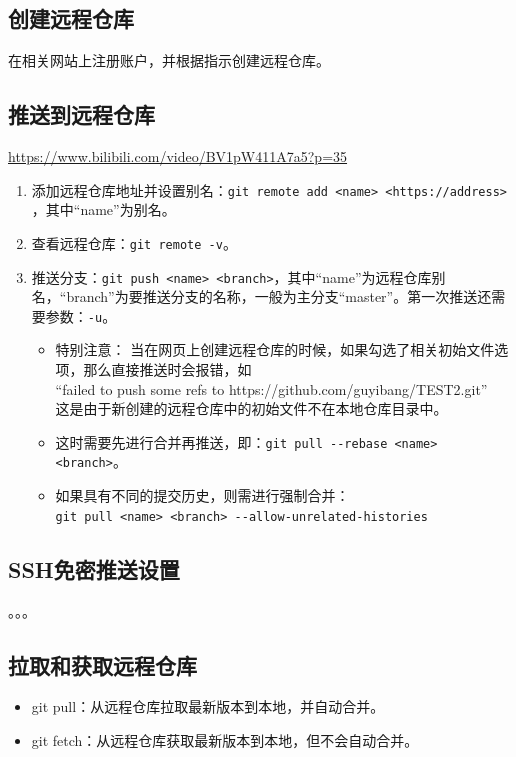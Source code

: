 \subsection{创建远程仓库}
在相关网站上注册账户，并根据指示创建远程仓库。



\subsection{推送到远程仓库}
\url{https://www.bilibili.com/video/BV1pW411A7a5?p=35}
\begin{enumerate}
\item 添加远程仓库地址并设置别名：\verb|git remote add <name> <https://address> |，其中“name”为别名。
\item 查看远程仓库：\verb|git remote -v|。
\item 推送分支：\verb|git push <name> <branch>|，其中“name”为远程仓库别名，“branch”为要推送分支的名称，一般为主分支“master”。第一次推送还需要参数：\verb|-u|。
\begin{itemize}
\item 特别注意： 当在网页上创建远程仓库的时候，如果勾选了相关初始文件选项，那么直接推送时会报错，如\\
“failed to push some refs to https://github.com/guyibang/TEST2.git”\\
这是由于新创建的远程仓库中的初始文件不在本地仓库目录中。
\item 这时需要先进行合并再推送，即：\verb|git pull --rebase <name> <branch>|。
\item 如果具有不同的提交历史，则需进行强制合并：\\ 
\verb|git pull <name> <branch> --allow-unrelated-histories |
\end{itemize}
\end{enumerate}




\subsection{SSH免密推送设置}
。。。



\subsection{拉取和获取远程仓库}
\begin{itemize}
\item git pull：从远程仓库拉取最新版本到本地，并自动合并。
\item git fetch：从远程仓库获取最新版本到本地，但不会自动合并。
\end{itemize}


